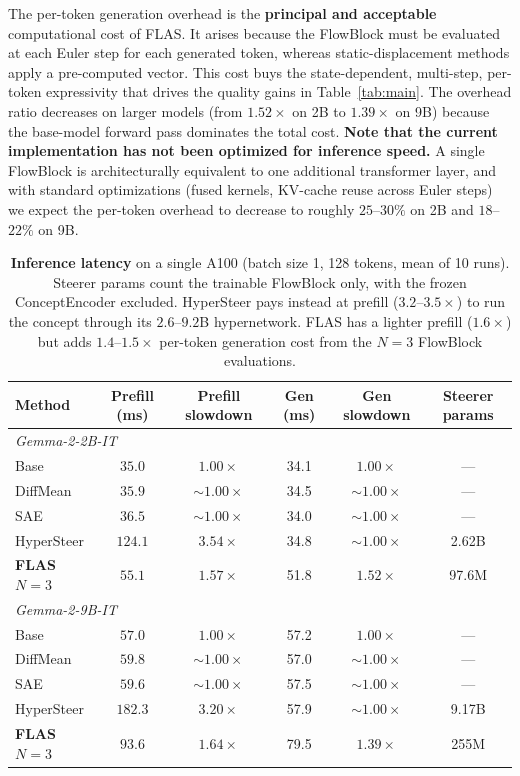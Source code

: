 \documentclass{article}
\begin{document}
The per-token generation overhead is the \textbf{principal and acceptable} computational cost of FLAS. It arises because the FlowBlock must be evaluated at each Euler step for each generated token, whereas static-displacement methods apply a pre-computed vector. This cost buys the state-dependent, multi-step, per-token expressivity that drives the quality gains in Table~\ref{tab:main}. The overhead ratio decreases on larger models (from $1.52\times$ on 2B to $1.39\times$ on 9B) because the base-model forward pass dominates the total cost. \textbf{Note that the current implementation has not been optimized for inference speed.} A single FlowBlock is architecturally equivalent to one additional transformer layer, and with standard optimizations (fused kernels, KV-cache reuse across Euler steps) we expect the per-token overhead to decrease to roughly $25$--$30\%$ on 2B and $18$--$22\%$ on 9B.

\begin{table}[htbp]
\centering\small
\begin{tabular}{lccccc}
\toprule
\textbf{Method} & \textbf{Prefill (ms)} & \textbf{Prefill slowdown} & \textbf{Gen (ms)} & \textbf{Gen slowdown} & \textbf{Steerer params} \\
\midrule
\multicolumn{6}{l}{\textit{Gemma-2-2B-IT}} \\
Base       & $35.0 $ & $1.00\times$ & 34.1 & $1.00\times$ & --- \\
DiffMean   & $35.9 $ & ${\sim}1.00\times$ & 34.5 & ${\sim}1.00\times$ & --- \\
SAE        & $36.5 $ & ${\sim}1.00\times$ & 34.0 & ${\sim}1.00\times$ & --- \\
HyperSteer & $124.1$ & $\mathbf{3.54\times}$ & 34.8 & ${\sim}1.00\times$ & 2.62B \\
\textbf{FLAS} $N\!=\!3$ & $55.1$ & $\mathbf{1.57\times}$ & 51.8 & $1.52\times$ & 97.6M \\
\midrule
\multicolumn{6}{l}{\textit{Gemma-2-9B-IT}} \\
Base       & $57.0$ & $1.00\times$ & 57.2 & $1.00\times$ & --- \\
DiffMean   & $59.8$ & ${\sim}1.00\times$ & 57.0 & ${\sim}1.00\times$ & --- \\
SAE        & $59.6$ & ${\sim}1.00\times$ & 57.5 & ${\sim}1.00\times$ & --- \\
HyperSteer & $182.3$ & $\mathbf{3.20\times}$ & 57.9 & ${\sim}1.00\times$ & 9.17B \\
\textbf{FLAS} $N\!=\!3$ & $93.6$ & $\mathbf{1.64\times}$ & 79.5 & $1.39\times$ & 255M \\
\bottomrule
\end{tabular}
\caption{\textbf{Inference latency} on a single A100 (batch size 1, 128 tokens, mean of 10 runs). Steerer params count the trainable FlowBlock only, with the frozen ConceptEncoder excluded. HyperSteer pays instead at prefill ($3.2$--$3.5\times$) to run the concept through its $2.6$--$9.2$B hypernetwork. FLAS has a lighter prefill ($1.6\times$) but adds $1.4$--$1.5\times$ per-token generation cost from the $N\!=\!3$ FlowBlock evaluations.}
\label{tab:latency}
\vspace{-2em}
\end{table}
\end{document}
